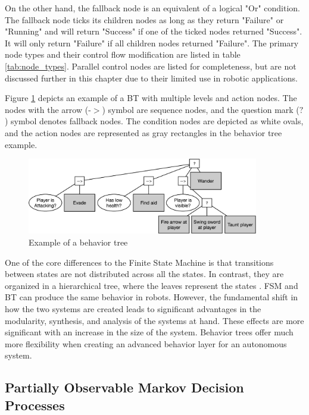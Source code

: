On the other hand, the fallback node is an equivalent of a logical "Or" condition. The fallback node ticks its children nodes as long as they return "Failure" or "Running" and will return "Success" if one of the ticked nodes returned "Success". It will only return "Failure" if all children nodes returned "Failure". The primary node types and their control flow modification are listed in table \ref{tab:node_types}. Parallel control nodes are listed for completeness, but are not discussed further in this chapter due to their limited use in robotic applications.

Figure \ref{fig:bt_example} depicts an example of a BT with multiple levels and action nodes. The nodes with the arrow (-$>$) symbol are sequence nodes, and the question mark ($?$) symbol denotes fallback nodes. The condition nodes are depicted as white ovals, and the action nodes are represented as gray rectangles in the behavior tree example.

\begin{figure}[ht]
	\centering
	\includegraphics[width=0.9\textwidth]{images/bt_example.jpg} 
	\caption{Example of a behavior tree \cite{iovino2022}}
	\label{fig:bt_example}
\end{figure}

One of the core differences to the Finite State Machine is that transitions between states are not distributed across all the states. In contrast, they are organized in a hierarchical tree, where the leaves represent the states \cite{iovino2022}. FSM and BT can produce the same behavior in robots. However, the fundamental shift in how the two systems are created leads to significant advantages in the modularity, synthesis, and analysis of the systems at hand. These effects are more significant with an increase in the size of the system. Behavior trees offer much more flexibility when creating an advanced behavior layer for an autonomous system. 


\subsection{Partially Observable Markov Decision Processes}

